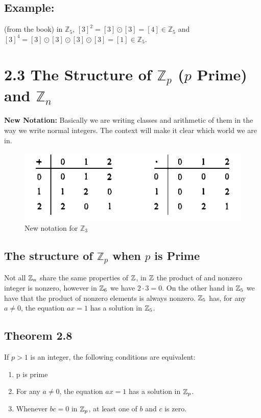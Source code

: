 \documentclass{article}
\begin{document}
\subsection*{Example:}(from the book) in $\mathbb{Z}_{5}$, $[3]^2 = [3] \odot [3] = [4] \in \mathbb{Z}_5$ and $[3]^4 = [3] \odot [3] \odot [3] \odot [3]= [1] \in \mathbb{Z}_5$. 
\section*{2.3 The Structure of $\mathbb{Z}_p$ ($p$ Prime) and $\mathbb{Z}_n$}
\textbf{New Notation:} Basically we are writing classes and arithmetic of them in the way we write normal integers. The context will make it clear
which world we are in.
\begin{figure}[h]
    \centering
    \includegraphics[scale=0.7]{classarithmetic.png}
    \caption{New notation for $\mathbb{Z}_3$}\label{fig:New notation for Z sub 3}
\end{figure}

\subsection*{The structure of $\mathbb{Z}_p$ when $p$ is Prime}

Not all $\mathbb{Z}_n$ share the same properties of $\mathbb{Z}$, in $\mathbb{Z}$ the product of and nonzero integer is nonzero, however
in $\mathbb{Z}_6$ we have $2 \cdot 3 = 0$. On the other hand in $\mathbb{Z}_5$ we have that the product of nonzero elements is always
nonzero. $\mathbb{Z}_5$ has, for any $a\neq0$, the equation $ax=1$ has a solution in $\mathbb{Z}_5$.

\subsection*{Theorem 2.8}
If $p > 1$ is an integer, the following conditions are equivalent:
\begin{enumerate}
    \item p is prime
    \item For any $a\neq0$, the equation $ax=1$ has a solution in $\mathbb{Z}_p$.
    \item Whenever $bc=0$ in $\mathbb{Z}_p$, at least one of $b$ and $c$ is zero.
\end{enumerate}
\end{document}
